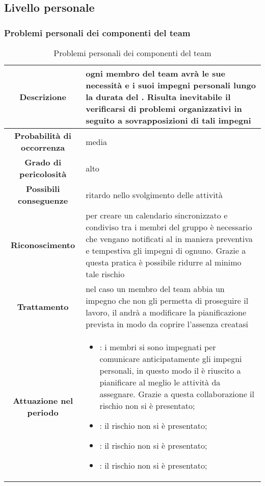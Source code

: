 \documentclass[PianoDiProgetto.tex]{subfiles}
\begin{document}
	\clearpage	
	\subsection{Livello personale}
		\subsubsection{Problemi personali dei componenti del team}
			\label{sec:ppdct}
			
\begin{table}[h]
		\begin{center}
			\begin{tabular}{ | c | p{10cm} |}
				\hline				
			

		 \textbf{Descrizione} & ogni membro del team avrà le sue necessità e i suoi impegni personali lungo la durata del \gl{progetto}. Risulta inevitabile il verificarsi di problemi organizzativi in seguito a sovrapposizioni di tali impegni \\ \hline
		 \textbf{Probabilità di occorrenza} & media \\ \hline
		 \textbf{Grado di pericolosità} & alto \\ \hline
		 \textbf{Possibili conseguenze} & ritardo nello svolgimento delle attività \\ \hline
		 \textbf{Riconoscimento} &  per creare un calendario sincronizzato e condiviso tra i membri del gruppo è necessario che vengano notificati al \RESP{} in maniera preventiva e tempestiva gli impegni di ognuno. Grazie a questa pratica è possibile ridurre al minimo tale rischio \\ \hline
		 \textbf{Trattamento} & nel caso un membro del team abbia un impegno che non gli permetta di proseguire il lavoro, il \RESP{} andrà a modificare la pianificazione prevista in modo da coprire l'assenza creatasi \\ \hline
		 \textbf{Attuazione nel periodo}& 
			\begin{itemize}
				\item \PerAR : i membri si sono impegnati per comunicare anticipatamente gli impegni personali, in questo modo il \RESP{} è riuscito a pianificare al meglio le attività da assegnare. Grazie a questa collaborazione il rischio non si è presentato;
				\item \PerAD: il rischio non si è presentato;
				\item \PerPA: il rischio non si è presentato;
				\item \PerPD: il rischio non si è presentato;
			\end{itemize}
			\\ \hline	
\end{tabular}
		\caption{Problemi personali dei componenti del team}
		\end{center}	
	\end{table}		
	
\end{document}
